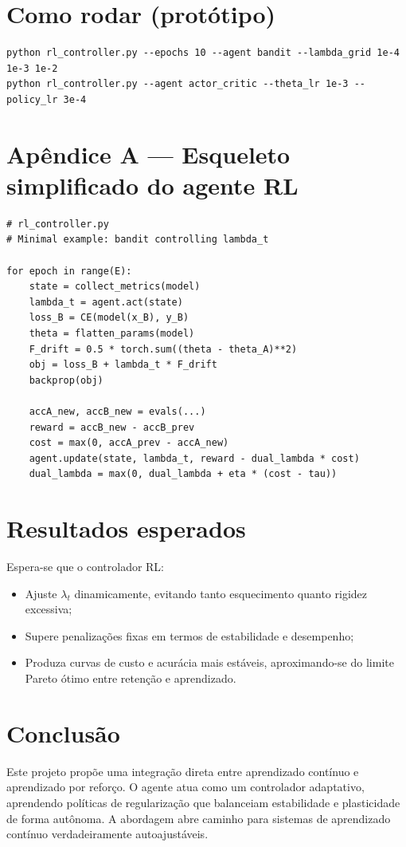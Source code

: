 \documentclass[9pt,a4paper]{extarticle}
\begin{document}
\section*{Como rodar (protótipo)}
\begin{verbatim}
python rl_controller.py --epochs 10 --agent bandit --lambda_grid 1e-4 1e-3 1e-2
python rl_controller.py --agent actor_critic --theta_lr 1e-3 --policy_lr 3e-4
\end{verbatim}

\appendix
\section*{Apêndice A — Esqueleto simplificado do agente RL}

\begin{lstlisting}
# rl_controller.py
# Minimal example: bandit controlling lambda_t

for epoch in range(E):
    state = collect_metrics(model)
    lambda_t = agent.act(state)
    loss_B = CE(model(x_B), y_B)
    theta = flatten_params(model)
    F_drift = 0.5 * torch.sum((theta - theta_A)**2)
    obj = loss_B + lambda_t * F_drift
    backprop(obj)

    accA_new, accB_new = evals(...)
    reward = accB_new - accB_prev
    cost = max(0, accA_prev - accA_new)
    agent.update(state, lambda_t, reward - dual_lambda * cost)
    dual_lambda = max(0, dual_lambda + eta * (cost - tau))
\end{lstlisting}

\section{Resultados esperados}
Espera-se que o controlador RL:
\begin{itemize}
    \item Ajuste $\lambda_t$ dinamicamente, evitando tanto esquecimento quanto rigidez excessiva;
    \item Supere penalizações fixas em termos de estabilidade e desempenho;
    \item Produza curvas de custo e acurácia mais estáveis, aproximando-se do limite Pareto ótimo entre retenção e aprendizado.
\end{itemize}

\section{Conclusão}
Este projeto propõe uma integração direta entre aprendizado contínuo e aprendizado por reforço. O agente atua como um controlador adaptativo, aprendendo políticas de regularização que balanceiam estabilidade e plasticidade de forma autônoma. A abordagem abre caminho para sistemas de aprendizado contínuo verdadeiramente autoajustáveis.
\end{document}

